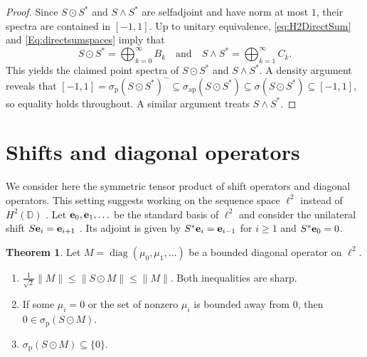 \documentclass[10pt,reqno]{amsart}
\newcommand{\0}{{\color{lightgray}0}}
\newcommand{\D}{\mathbb{D}}
\renewcommand{\leq}{\leqslant}
\renewcommand{\geq}{\geqslant}
\newcommand{\diag}{\operatorname{diag}}
\newcommand{\norm}[1]{\| #1 \|}
\renewcommand{\vec}[1]{{\bf #1}}
\theoremstyle{definition}
\newtheorem{Theorem}[equation]{Theorem}
\numberwithin{equation}{section}
\begin{document}
\begin{proof}
Since $S \odot S^*$ and $S \wedge S^*$ are selfadjoint and have norm at most $1$,
their spectra are contained in $[-1,1]$.
Up to unitary equivalence, \eqref{eq:H2DirectSum} and \eqref{Eq:directsumspaces} imply that
\begin{equation}\label{Eq:directsum}
S \odot S^* = \bigoplus_{k=0}^{\infty} B_k \quad \text{and} \quad S \wedge S^* = \bigoplus_{k=1}^{\infty} C_k .
\end{equation}
This yields the claimed point spectra of $S \odot S^*$ and $S \wedge S^*$.  
A density argument reveals that $[-1,1] = \sigma_{\textrm{p}}(S \odot S^*)^- \subseteq \sigma_{\textrm{ap}}(S \odot S^*) \subseteq \sigma(S \odot S^*) \subseteq [-1,1]$, so equality holds throughout.  A similar argument treats $S \wedge S^*$.  
\end{proof}


\section{Shifts and diagonal operators}\label{Chapter:ShiftDiagonal}

We consider here the symmetric tensor product of shift operators and diagonal operators.
This setting suggests working on the sequence space $\ell^2$ instead of $H^2(\D)$ \cite[Sec.~1.2]{OTBE}.
Let $\vec{e}_0, \vec{e}_1, \ldots$ be the standard basis of $\ell^2$ and consider
the unilateral shift $S \vec{e}_i = \vec{e}_{i+1}$ \cite[Ch.~3]{OTBE}.  Its adjoint is given by
$S^* \vec{e}_i = \vec{e}_{i-1}$ for $i \geq 1$ and $S^* \vec{e}_0 = 0$.

\begin{Theorem}\label{Theorem:ShiftDiagSpec}
Let $M = \diag(\mu_0,\mu_1,\ldots)$ be a bounded diagonal operator on $\ell^2$.
\begin{enumerate}
\item $\frac{1}{\sqrt{2}} \norm{M} \leq \norm{S \odot M} \leq \| M \|$. Both inequalities are sharp.

\item If some $\mu_i = 0$ or the set of nonzero $\mu_i$ is bounded away from $0$, then $0 \in \sigma_{\mathrm{p}}(S \odot M)$.

\item $\sigma_{\mathrm{p}} (S \odot M) \subseteq \{ 0 \}$. 
\end{enumerate}
\end{Theorem}
\end{document}
